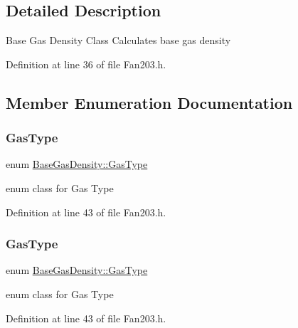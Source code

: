 \subsection{Detailed Description}
Base Gas Density Class Calculates base gas density 

Definition at line 36 of file Fan203.\+h.



\subsection{Member Enumeration Documentation}
\mbox{\label{class_base_gas_density_afb215e48f6193462521b7e8d47306ed3}} 
\subsubsection{\texorpdfstring{Gas\+Type}{GasType}\hspace{0.1cm}{\footnotesize\ttfamily [1/3]}}
{\footnotesize\ttfamily enum \hyperlink{class_base_gas_density_afb215e48f6193462521b7e8d47306ed3}{Base\+Gas\+Density\+::\+Gas\+Type}\hspace{0.3cm}{\ttfamily [strong]}}

enum class for Gas Type 

Definition at line 43 of file Fan203.\+h.

\mbox{\label{class_base_gas_density_afb215e48f6193462521b7e8d47306ed3}} 
\subsubsection{\texorpdfstring{Gas\+Type}{GasType}\hspace{0.1cm}{\footnotesize\ttfamily [2/3]}}
{\footnotesize\ttfamily enum \hyperlink{class_base_gas_density_afb215e48f6193462521b7e8d47306ed3}{Base\+Gas\+Density\+::\+Gas\+Type}\hspace{0.3cm}{\ttfamily [strong]}}

enum class for Gas Type 

Definition at line 43 of file Fan203.\+h.

\mbox{\label{class_base_gas_density_afb215e48f6193462521b7e8d47306ed3}} 
